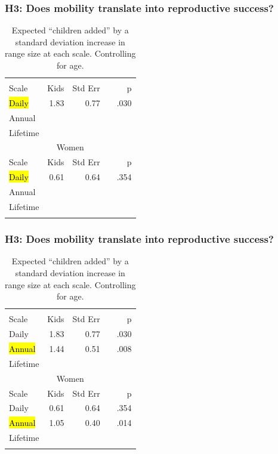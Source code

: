 \documentclass{beamer}
\makeatletter
\newcommand\SoulColor{%
  \let\set@color\beamerorig@set@color
  \let\reset@color\beamerorig@reset@color}
\makeatother
\begin{document}
\begin{frame}
\frametitle{H3: Does mobility translate into reproductive success?}
\begin{table}
\begin{tabular}{lrrrr}
\hline\noalign{\smallskip}
\multicolumn{5}{c}{Men} \\
Scale & Kids & Std Err && p \\
\SoulColor\hl{Daily} & 1.83 & 0.77 && .030 \\
Annual &  &  && \\
Lifetime &  &  &&\\
\multicolumn{5}{c}{Women} \\
Scale & Kids & Std Err && p \\
\SoulColor\hl{Daily} & 0.61 & 0.64 && .354 \\
Annual & & && \\
Lifetime &  &  && \\
\noalign{\smallskip}\hline
\end{tabular}\par
\caption{\small{Expected ``children added'' by a standard deviation increase in range size at each scale. Controlling for age.}}
\end{table}		  

\end{frame}


\begin{frame}
\frametitle{H3: Does mobility translate into reproductive success?}
\begin{table}
\begin{tabular}{lrrrr}
\hline\noalign{\smallskip}
\multicolumn{5}{c}{Men} \\
Scale & Kids & Std Err && p \\
Daily & 1.83 & 0.77 && .030\\
\SoulColor\hl{Annual} & 1.44 & 0.51 && .008\\
Lifetime &  &  &&\\
\multicolumn{5}{c}{Women} \\
Scale & Kids & Std Err && p \\
Daily & 0.61 & 0.64 && .354 \\
\SoulColor\hl{Annual} & 1.05 & 0.40 && .014 \\
Lifetime &  &  && \\
\noalign{\smallskip}\hline
\end{tabular}\par
\caption{\small{Expected ``children added'' by a standard deviation increase in range size at each scale. Controlling for age.}}
\end{table}		  

\end{frame}
\end{document}
